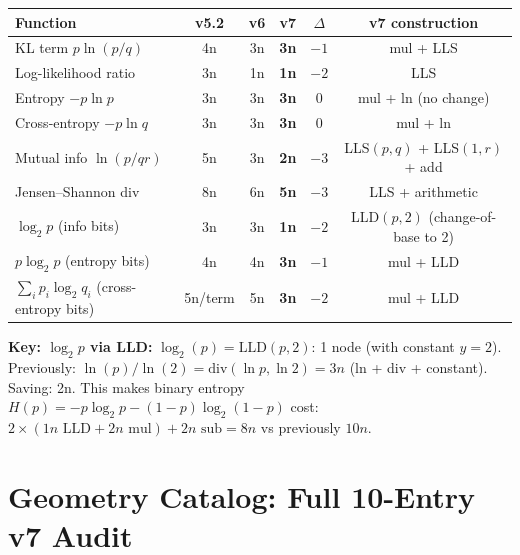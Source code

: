 \documentclass[11pt]{article}
\newcommand{\imp}[1]{\textcolor{imp}{\textbf{#1}}}
\begin{document}
\begin{center}
\begin{tabular}{lccccc}
\toprule
Function & v5.2 & v6 & v7 & $\Delta$ & v7 construction \\
\midrule
KL term $p\ln(p/q)$      & 4n & 3n & \imp{3n}  & $-1$ & mul + LLS \\
Log-likelihood ratio      & 3n & 1n & \imp{1n}  & $-2$ & LLS \\
Entropy $-p\ln p$         & 3n & 3n & \imp{3n}  & $0$  & mul + ln (no change) \\
Cross-entropy $-p\ln q$   & 3n & 3n & \imp{3n}  & $0$  & mul + ln \\
Mutual info $\ln(p/qr)$   & 5n & 3n & \imp{2n}  & $-3$ & LLS$(p,q)$ + LLS$(1,r)$ + add \\
Jensen--Shannon div       & 8n & 6n & \imp{5n}  & $-3$ & LLS + arithmetic \\
$\log_2 p$ (info bits)    & 3n & 3n & \imp{1n}  & $-2$ & LLD$(p, 2)$ (change-of-base to 2) \\
$p \log_2 p$ (entropy bits) & 4n & 4n & \imp{3n} & $-1$ & mul + LLD \\
$\sum_i p_i \log_2 q_i$ (cross-entropy bits) & 5n/term & 5n & \imp{3n} & $-2$ & mul + LLD \\
\bottomrule
\end{tabular}
\end{center}

\noindent \textbf{Key: $\log_2 p$ via LLD:}
$\log_2(p) = \mathrm{LLD}(p, 2)$: 1 node (with constant $y = 2$).
Previously: $\ln(p)/\ln(2) = \mathrm{div}(\ln p, \ln 2) = 3n$ (ln + div + constant).
Saving: 2n. This makes binary entropy $H(p) = -p\log_2 p - (1-p)\log_2(1-p)$
cost: $2 \times (1n\text{ LLD} + 2n\text{ mul}) + 2n\text{ sub} = 8n$ vs previously $10n$.

\section{Geometry Catalog: Full 10-Entry v7 Audit}
\label{sec:geometry}
\end{document}

